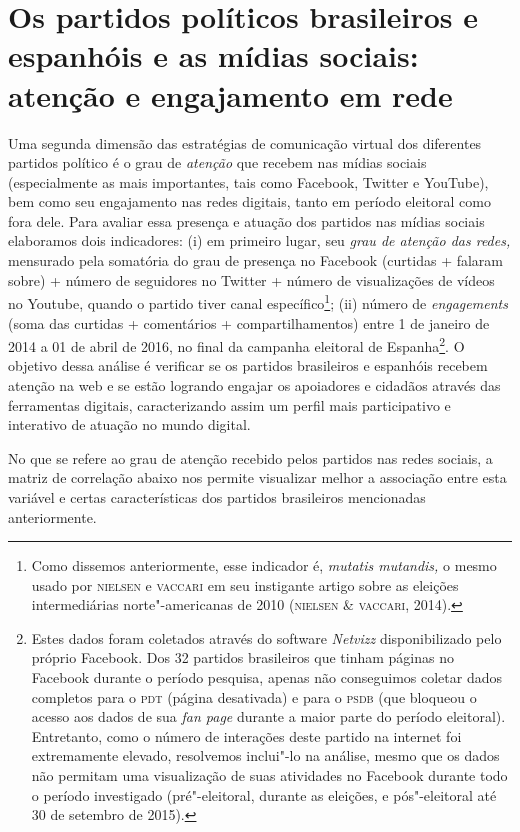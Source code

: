 \section{Os partidos políticos brasileiros e espanhóis e as mídias sociais:
atenção e engajamento em rede}

Uma segunda dimensão das estratégias de comunicação virtual dos
diferentes partidos político é o grau de \emph{atenção} que recebem nas
mídias sociais (especialmente as mais importantes, tais como Facebook,
Twitter e YouTube), bem como seu engajamento nas redes digitais, tanto
em período eleitoral como fora dele. Para avaliar essa presença e
atuação dos partidos nas mídias sociais elaboramos dois indicadores: (i)
em primeiro lugar, seu \emph{grau de atenção das redes,} mensurado pela
somatória do grau de presença no Facebook (curtidas + falaram sobre) +
número de seguidores no Twitter + número de visualizações de vídeos no
Youtube, quando o partido tiver canal específico\footnote{Como dissemos
  anteriormente, esse indicador é, \emph{mutatis mutandis,} o mesmo
  usado por \textsc{nielsen} e \textsc{vaccari} em seu instigante artigo sobre as eleições
  intermediárias norte"-americanas de 2010 (\textsc{nielsen} \& \textsc{vaccari}, 2014).};
(ii) número de \emph{engagements} (soma das curtidas + comentários +
compartilhamentos) entre 1 de janeiro de 2014 a 01 de abril de 2016, no
final da campanha eleitoral de Espanha\footnote{Estes dados foram
  coletados através do software \emph{Netvizz} disponibilizado pelo
  próprio Facebook. Dos 32 partidos brasileiros que tinham páginas no
  Facebook durante o período pesquisa, apenas não conseguimos coletar
  dados completos para o \textsc{pdt} (página desativada) e para o \textsc{psdb} (que
  bloqueou o acesso aos dados de sua \emph{fan page} durante a maior
  parte do período eleitoral). Entretanto, como o número de interações
  deste partido na internet foi extremamente elevado, resolvemos
  inclui"-lo na análise, mesmo que os dados não permitam uma visualização
  de suas atividades no Facebook durante todo o período investigado
  (pré"-eleitoral, durante as eleições, e pós"-eleitoral até 30 de
  setembro de 2015).}. O objetivo dessa análise é verificar se os
partidos brasileiros e espanhóis recebem atenção na web e se estão
logrando engajar os apoiadores e cidadãos através das ferramentas
digitais, caracterizando assim um perfil mais participativo e interativo
de atuação no mundo digital.

No que se refere ao grau de atenção recebido pelos partidos nas redes
sociais, a matriz de correlação abaixo nos permite visualizar melhor a
associação entre esta variável e certas características dos partidos
brasileiros mencionadas anteriormente.

